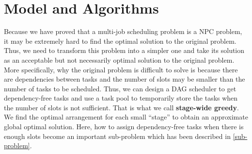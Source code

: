 \section{Model and Algorithms}
Because we have proved that a  multi-job scheduling problem is a NPC problem, it may be extremely hard to find the optimal solution to the original problem. Thus, we need to transform this problem into a simpler one and take its solution as an acceptable but not necessarily optimal solution to the original problem. More specifically, why the original problem is difficult to solve is because there are dependencies between tasks and the number of slots may be smaller than the number of tasks to be scheduled. Thus, we can design a DAG scheduler to get dependency-free tasks and use a task pool to temporarily store the tasks when the number of slots is not sufficient. That is what we call \textbf{stage-wide greedy}. We find the optimal arrangement for each small ``stage'' to obtain an approximate global optimal solution. Here, how to assign dependency-free tasks when there is enough slots become an important sub-problem which has been described in \ref{sub-problem}.


